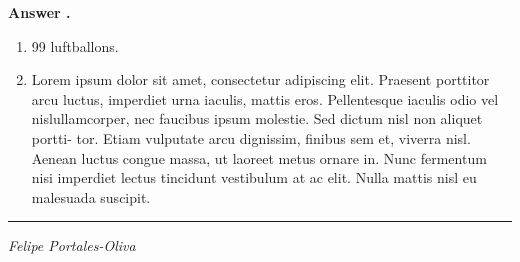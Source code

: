 \documentclass[13pt , a4paper]{article}
\begin{document}
 \textbf{Answer .}\\
\begin{enumerate}
    \item  99 luftballons.
\item Lorem ipsum dolor sit amet, consectetur adipiscing elit. Praesent porttitor arcu
luctus, imperdiet urna iaculis, mattis eros. Pellentesque iaculis odio vel nislullamcorper, nec faucibus ipsum molestie. Sed dictum nisl non aliquet portti-
tor. Etiam vulputate arcu dignissim, finibus sem et, viverra nisl. Aenean luctus
congue massa, ut laoreet metus ornare in. Nunc fermentum nisi imperdiet lectus
tincidunt vestibulum at ac elit. Nulla mattis nisl eu malesuada suscipit.
\end{enumerate}
 \vskip6.2cm

\hrule
\begin{flushright}
\textit{Felipe Portales-Oliva}

\end{flushright}
\pagestyle{empty}
\end{document}
